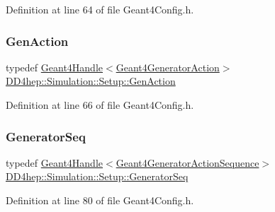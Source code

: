 Definition at line 64 of file Geant4\+Config.\+h.

\hypertarget{namespace_d_d4hep_1_1_simulation_1_1_setup_a14c151f5ea2ebe374531259e0a2d5446}{}\label{namespace_d_d4hep_1_1_simulation_1_1_setup_a14c151f5ea2ebe374531259e0a2d5446} 
\subsubsection{\texorpdfstring{Gen\+Action}{GenAction}}
{\footnotesize\ttfamily typedef \hyperlink{class_d_d4hep_1_1_simulation_1_1_geant4_handle}{Geant4\+Handle}$<$\hyperlink{class_d_d4hep_1_1_simulation_1_1_geant4_generator_action}{Geant4\+Generator\+Action}$>$ \hyperlink{namespace_d_d4hep_1_1_simulation_1_1_setup_a14c151f5ea2ebe374531259e0a2d5446}{D\+D4hep\+::\+Simulation\+::\+Setup\+::\+Gen\+Action}}



Definition at line 66 of file Geant4\+Config.\+h.

\hypertarget{namespace_d_d4hep_1_1_simulation_1_1_setup_aeb672344cb12e47b674a3ca15d4eddad}{}\label{namespace_d_d4hep_1_1_simulation_1_1_setup_aeb672344cb12e47b674a3ca15d4eddad} 
\subsubsection{\texorpdfstring{Generator\+Seq}{GeneratorSeq}}
{\footnotesize\ttfamily typedef \hyperlink{class_d_d4hep_1_1_simulation_1_1_geant4_handle}{Geant4\+Handle}$<$\hyperlink{class_d_d4hep_1_1_simulation_1_1_geant4_generator_action_sequence}{Geant4\+Generator\+Action\+Sequence}$>$ \hyperlink{namespace_d_d4hep_1_1_simulation_1_1_setup_aeb672344cb12e47b674a3ca15d4eddad}{D\+D4hep\+::\+Simulation\+::\+Setup\+::\+Generator\+Seq}}



Definition at line 80 of file Geant4\+Config.\+h.

\hypertarget{namespace_d_d4hep_1_1_simulation_1_1_setup_ad0eadfa9fa826619419b5350ce1bafae}{}\label{namespace_d_d4hep_1_1_simulation_1_1_setup_ad0eadfa9fa826619419b5350ce1bafae} 
